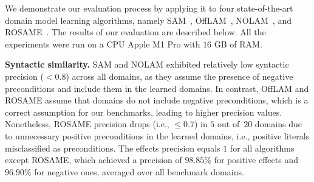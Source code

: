 \documentclass[letterpaper]{article} %
\newcommand{\nolam}{NOLAM\xspace}
\newcommand{\offlam}{OffLAM\xspace}
\newcommand{\rosame}{ROSAME\xspace}
\newcommand{\samshort}{SAM\xspace}
\newcommand{\miniparagraph}[1]{\textbf{#1.}}
\newif\ifaddcomments
\newcommand{\roni}[1]{\ifaddcomments{\textcolor{red}{[Roni: #1]}}\fi}
\newcommand{\leo}[1]{\ifaddcomments{\textcolor{pink}{[Leonardo: #1]}}\fi}
\begin{document}
We demonstrate our evaluation process by applying it to four state-of-the-art domain model learning algorithms, namely \samshort~\citep{juba2021safe}, \offlam~\citep{LAMANNA2025104256}, \nolam~\citep{Lamanna24}, and \rosame~\citep{xi2024neuro}. The results of our evaluation are described below. 
All the experiments were run on a CPU Apple M1 Pro with $16$ GB of RAM.
\leo{need to rerun ROSAME using same resources. TODO: Leonardo}





\miniparagraph{Syntactic similarity} 
\samshort and \nolam exhibited relatively low syntactic precision ($<0.8$) across all domains, as they assume the presence of negative preconditions and include them in the learned domains. 
In contrast, \offlam and \rosame assume that domains do not include negative preconditions, which is a correct assumption for our benchmarks, leading to higher precision values.
%
Nonetheless, \rosame precision drops (i.e., $\le 0.7$) in $5$ out of~$20$ domains due to unnecessary positive preconditions in the learned domains, i.e., positive literals misclassified as preconditions.
%
The effects precision equals $1$ for all algorithms except \rosame, which achieved a precision of $98.85\%$ for positive effects and $96.90\%$ for negative ones, averaged over all benchmark domains. 
\end{document}
